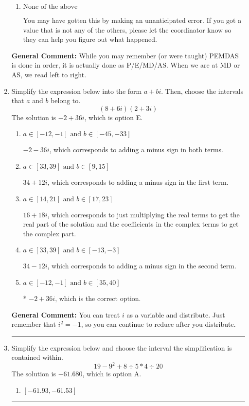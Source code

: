 \documentclass{extbook}[14pt]
\newcommand{\litem}[1]{\item #1

\rule{\textwidth}{0.4pt}}
\begin{document}
\begin{enumerate}
{\begin{enumerate}[label=\Alph*.]
* -99.815, this is the correct option
\item \( \text{None of the above} \)

 You may have gotten this by making an unanticipated error. If you got a value that is not any of the others, please let the coordinator know so they can help you figure out what happened.
\end{enumerate}

\textbf{General Comment:} While you may remember (or were taught) PEMDAS is done in order, it is actually done as P/E/MD/AS. When we are at MD or AS, we read left to right.
}
\litem{
Simplify the expression below into the form $a+bi$. Then, choose the intervals that $a$ and $b$ belong to.
\[ (8 + 6 i)(2 + 3 i) \]The solution is \( -2 + 36 i \), which is option E.\begin{enumerate}[label=\Alph*.]
\item \( a \in [-12, -1] \text{ and } b \in [-45, -33] \)

 $-2 - 36 i$, which corresponds to adding a minus sign in both terms.
\item \( a \in [33, 39] \text{ and } b \in [9, 15] \)

 $34 + 12 i$, which corresponds to adding a minus sign in the first term.
\item \( a \in [14, 21] \text{ and } b \in [17, 23] \)

 $16 + 18 i$, which corresponds to just multiplying the real terms to get the real part of the solution and the coefficients in the complex terms to get the complex part.
\item \( a \in [33, 39] \text{ and } b \in [-13, -3] \)

 $34 - 12 i$, which corresponds to adding a minus sign in the second term.
\item \( a \in [-12, -1] \text{ and } b \in [35, 40] \)

* $-2 + 36 i$, which is the correct option.
\end{enumerate}

\textbf{General Comment:} You can treat $i$ as a variable and distribute. Just remember that $i^2=-1$, so you can continue to reduce after you distribute.
}
\litem{
Simplify the expression below and choose the interval the simplification is contained within.
\[ 19 - 9^2 + 8 \div 5 * 4 \div 20 \]The solution is \( -61.680 \), which is option A.\begin{enumerate}[label=\Alph*.]
\item \( [-61.93, -61.53] \)


\end{enumerate}}
\end{enumerate}
\end{document}

